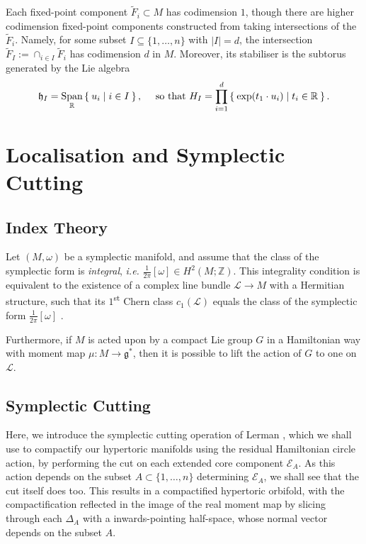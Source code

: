 \documentclass{amsart}
\newcommand{\ie}{\emph{i.e.} }
\newcommand{\ra}{\rightarrow}
\newcommand{\w}{\omega}
\newcommand{\RR}{\mathbb{R}}
\newcommand{\ZZ}{\mathbb{Z}}
\newcommand{\mcE}{\mathcal{E}}
\newcommand{\mcL}{\mathcal{L}}
\newcommand{\mfg}{\mathfrak{g}}
\newcommand{\mfh}{\mathfrak{h}}
\DeclareMathOperator{\Span}{Span}
\begin{document}
    Each fixed-point component $\tilde{F}_{i} \subset M$ has codimension $1$, though there are higher codimension fixed-point components constructed from taking intersections of the $\tilde{F}_{i}$. Namely, for some subset $I \subseteq \{1, \ldots, n\}$ with $|I| = d$, the intersection $\tilde{F}_{I} := \cap_{i \in I} \tilde{F}_{i}$ has codimension $d$ in $M$. Moreover, its stabiliser is the subtorus generated by the Lie algebra
    \[
    	\mfh_{I} = \Span_{\RR}\Set{u_{i} | i \in I}, \quad \text{ so that } H_{I} = \prod_{i=1}^{d}\Set{\exp(t_{1}\cdot u_{i}) | t_{i} \in \RR }.
    \]
    	
	\section{Localisation and Symplectic Cutting}
	
	\subsection{Index Theory}
	
	Let $(M, \w)$ be a symplectic manifold, and assume that the class of the symplectic form is \emph{integral}, \ie $\tfrac{1}{2\pi}[\w] \in H^{2}(M; \ZZ)$. This integrality condition is equivalent to the existence of a complex line bundle $\mcL \ra M$ with a Hermitian structure, such that its $1$\textsuperscript{st} Chern class $c_{1}(\mcL)$ equals the class of the symplectic form $\tfrac{1}{2\pi}[\w]$ \cite{Duistermaat2011}.
	
	Furthermore, if $M$ is acted upon by a compact Lie group $G$ in a Hamiltonian way with moment map $\mu : M \ra \mfg^{\ast}$, then it is possible to lift the action of $G$ to one on $\mcL$. 

	\subsection{Symplectic Cutting}
	
	Here, we introduce the symplectic cutting operation of Lerman \cite{Ler95}, which we shall use to compactify our hypertoric manifolds using the residual Hamiltonian circle action, by performing the cut on each extended core component $\mcE_{A}$. As this action depends on the subset $A \subset \{1, \ldots, n\}$ determining $\mcE_{A}$, we shall see that the cut itself does too. This results in a compactified hypertoric orbifold, with the compactification reflected in the image of the real moment map by slicing through each $\Delta_{A}$ with a inwards-pointing half-space, whose normal vector depends on the subset $A$.
	
\end{document}
